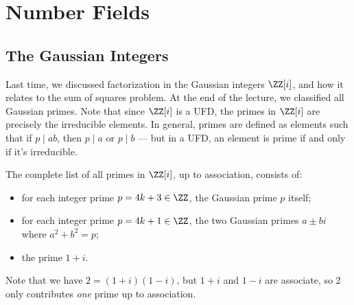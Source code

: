 
\section{Number Fields}

\subsection{The Gaussian Integers}

Last time, we discussed factorization in the Gaussian integers $\ZZ[i]$, and how it relates to the sum of squares problem. At the end of the lecture, we classified all Gaussian primes. Note that since $\ZZ[i]$ is a UFD, the primes in $\ZZ[i]$ are precisely the irreducible elements. In general, primes are defined as elements such that if $p \mid ab$, then $p \mid a$ or $p \mid b$ --- but in a UFD, an element is prime if and only if it's irreducible.



\begin{theorem}
The complete list of all primes in $\ZZ[i]$, up to association, consists of:
\begin{itemize}
    \item for each integer prime $p = 4k + 3 \in \ZZ$, the Gaussian prime $p$ itself;
    \item for each integer prime $p = 4k + 1 \in \ZZ$, the two Gaussian primes $a \pm bi$ where $a^2 + b^2 = p$;
    \item the prime $1 + i$. 
\end{itemize}
\end{theorem}

Note that we have $2 = (1 + i)(1 - i)$, but $1 + i$ and $1 - i$ are associate, so $2$ only contributes \emph{one} prime up to association. 

